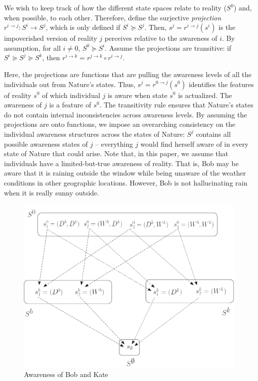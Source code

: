 \documentclass[
11pt,
titlepage,
reqno,
]{article}%
\theoremstyle{definition}
\begin{document}
We wish to keep track of how the different state spaces relate to reality ($S^0$) and, when possible, to each other. 
Therefore, define the surjective \textit{projection} $r^{i\rightarrow j}:S^i\rightarrow S^j$, which is only defined if  $S^i\succeq S^j$.
Then, $s^j=r^{i\rightarrow j}(s^i)$ is the impoverished version of reality $j$ perceives relative to the awareness of $i$. 
By assumption, for all $i\ne 0$, $S^0\succeq S^i$.
Assume the projections are transitive: if $S^i\succeq S^j\succeq S^k$, then $r^{i\rightarrow k}=r^{j\rightarrow k}\circ r^{i\rightarrow j}$.

Here, the projections are functions that are pulling the awareness levels of all the individuals out from Nature's states.
Thus, $s^j=r^{0\rightarrow j}(s^0)$ identifies the features of reality $s^0$ of which individual $j$ is aware when state $s^0$ is actualized.
The awareness of $j$ is a feature of $s^0$.
The transitivity rule ensures that Nature's states do not contain internal inconsistencies across awareness levels.
By assuming the projections are onto functions, we impose an overarching consistency on the individual awareness structures across the states of Nature:
$S^j$ contains all possible awareness states of $j$ -- everything $j$ would find herself aware of in every state of Nature that could arise.
Note that, in this paper, we assume that individuals have a limited-but-true awareness of reality.
That is, Bob may be aware that it is raining outside the window while being unaware of the weather conditions in other geographic locations.
However, Bob is not hallucinating rain when it is really sunny outside.
	
\begin{figure}[h!]	
	\begin{center}
		\includegraphics[scale=.4]{lattice.png}
	\end{center}
\caption{Awareness of Bob and Kate\label{fig:lattice}}
\end{figure}
\end{document}
